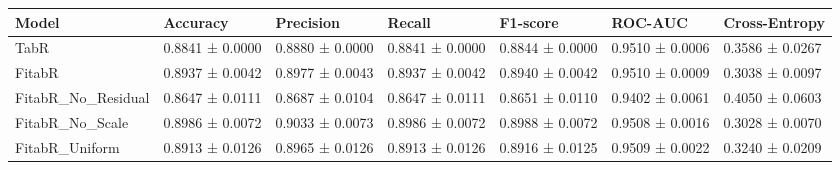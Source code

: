 \begin{tabular}{lllllll}
\toprule
Model & Accuracy & Precision & Recall & F1-score & ROC-AUC & Cross-Entropy \\
\midrule
TabR & 0.8841 ± 0.0000 & 0.8880 ± 0.0000 & 0.8841 ± 0.0000 & 0.8844 ± 0.0000 & 0.9510 ± 0.0006 & 0.3586 ± 0.0267 \\
FitabR & 0.8937 ± 0.0042 & 0.8977 ± 0.0043 & 0.8937 ± 0.0042 & 0.8940 ± 0.0042 & 0.9510 ± 0.0009 & 0.3038 ± 0.0097 \\
FitabR_No_Residual & 0.8647 ± 0.0111 & 0.8687 ± 0.0104 & 0.8647 ± 0.0111 & 0.8651 ± 0.0110 & 0.9402 ± 0.0061 & 0.4050 ± 0.0603 \\
FitabR_No_Scale & 0.8986 ± 0.0072 & 0.9033 ± 0.0073 & 0.8986 ± 0.0072 & 0.8988 ± 0.0072 & 0.9508 ± 0.0016 & 0.3028 ± 0.0070 \\
FitabR_Uniform & 0.8913 ± 0.0126 & 0.8965 ± 0.0126 & 0.8913 ± 0.0126 & 0.8916 ± 0.0125 & 0.9509 ± 0.0022 & 0.3240 ± 0.0209 \\
\bottomrule
\end{tabular}
